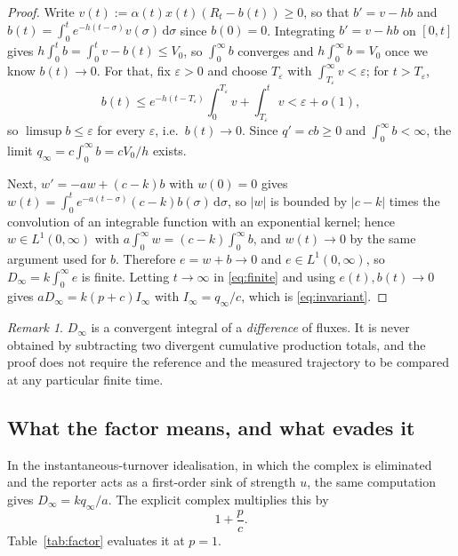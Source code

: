 \documentclass[11pt]{article}
\theoremstyle{definition}
\theoremstyle{remark}
\newtheorem{remark}[theorem]{Remark}
\newcommand{\dd}{\,\mathrm{d}}
\begin{document}
\begin{proof}
Write $v(t):=\alpha(t)x(t)(R_t-b(t))\ge0$, so that $b'=v-hb$ and
$b(t)=\int_0^t e^{-h(t-\sigma)}v(\sigma)\dd\sigma$ since $b(0)=0$. Integrating
$b'=v-hb$ on $[0,t]$ gives $h\int_0^t b=\int_0^t v-b(t)\le V_0$, so
$\int_0^\infty b$ converges and $h\int_0^\infty b=V_0$ once we know
$b(t)\to0$. For that, fix $\varepsilon>0$ and choose $T_\varepsilon$ with
$\int_{T_\varepsilon}^\infty v<\varepsilon$; for $t>T_\varepsilon$,
\[
b(t)\le e^{-h(t-T_\varepsilon)}\int_0^{T_\varepsilon}v
+\int_{T_\varepsilon}^{t}v<\varepsilon+o(1),
\]
so $\limsup b\le\varepsilon$ for every $\varepsilon$, i.e.\ $b(t)\to0$.
Since $q'=cb\ge0$ and $\int_0^\infty b<\infty$, the limit $q_\infty=c\int_0^\infty b
=cV_0/h$ exists.

Next, $w'=-aw+(c-k)b$ with $w(0)=0$ gives
$w(t)=\int_0^t e^{-a(t-\sigma)}(c-k)b(\sigma)\dd\sigma$, so $|w|$ is bounded by
$|c-k|$ times the convolution of an integrable function with an exponential
kernel; hence $w\in L^1(0,\infty)$ with
$a\int_0^\infty w=(c-k)\int_0^\infty b$, and $w(t)\to0$ by the same argument
used for $b$. Therefore $e=w+b\to0$ and $e\in L^1(0,\infty)$, so
$D_\infty=k\int_0^\infty e$ is finite. Letting $t\to\infty$ in \eqref{eq:finite}
and using $e(t),b(t)\to0$ gives $aD_\infty=k(p+c)I_\infty$ with
$I_\infty=q_\infty/c$, which is \eqref{eq:invariant}.
\end{proof}

\begin{remark}
$D_\infty$ is a convergent integral of a \emph{difference} of fluxes. It is
never obtained by subtracting two divergent cumulative production totals, and the
proof does not require the reference and the measured trajectory to be compared
at any particular finite time.
\end{remark}

\subsection{What the factor means, and what evades it}
\label{sec:meaning}

In the instantaneous-turnover idealisation, in which the complex is eliminated
and the reporter acts as a first-order sink of strength $u$, the same
computation gives $D_\infty=kq_\infty/a$. The explicit complex multiplies this by
\begin{equation}
1+\frac pc .
\label{eq:factor}
\end{equation}
Table~\ref{tab:factor} evaluates it at $p=1$.
\end{document}
